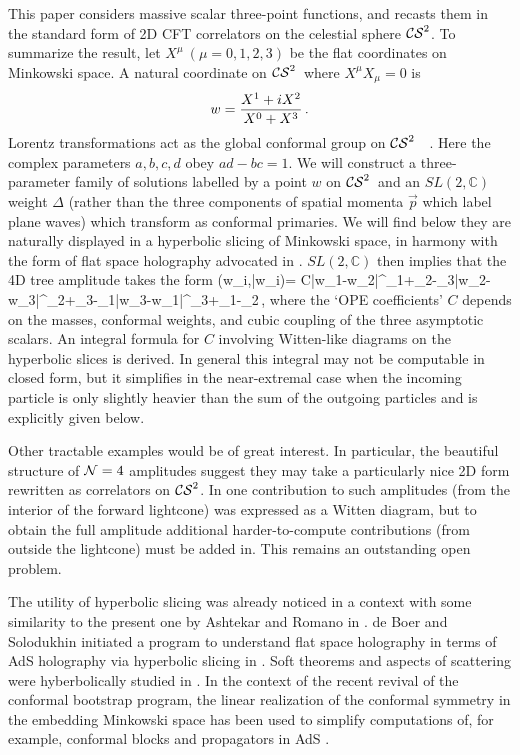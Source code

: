 \documentclass[12pt]{article}
\def\cst{${\cal CS}^2$}
\numberwithin{equation}{section}
\def\be#1\ee{\begin{align}#1\end{align}}
\begin{document}
This paper considers massive scalar three-point functions, and recasts them in the standard form of 2D CFT correlators on the celestial sphere \cst. To summarize the result, let $X^\mu~(\mu=0,1,2,3)$ be the flat coordinates on Minkowski space.   A natural coordinate on \cst\ where $X^\mu X_\mu=0$ is  
\begin{equation}\label{sdf} w={X^1+iX^2 \over X^0+X^3}\,.\end{equation}
Lorentz transformations act as the global conformal group on \cst\ 
\be w \to {aw+b\over cw+d}\,.\ee
Here the complex parameters $a,b,c,d$ obey $ad-bc=1$. We will construct a three-parameter family of solutions labelled by a point $w$ on \cst\ and an $SL(2,\mathbb{C})$  weight $\Delta$  (rather than the three components of spatial momenta $\vec p$ which label plane waves) which transform as conformal primaries. We will find below they are naturally displayed in a hyperbolic slicing of Minkowski space, in harmony with the form of flat space holography advocated in \cite{deBoer:2003vf}. 
$SL(2,\mathbb{C})$ then  implies that the  4D tree amplitude takes the form  
\be  \mathcal{ \tilde A} (w_i,\bar w_i)= {C\over |w_1-w_2|^{\Delta_1+\Delta_2-\Delta_3}|w_2-w_3|^{\Delta_2+\Delta_3-\Delta_1}|w_3-w_1|^{\Delta_3+\Delta_1-\Delta_2}}\,,\ee
where the `OPE coefficients'  $C$ depends on the masses, conformal weights, and cubic coupling of the three asymptotic scalars. An integral formula for $C$ involving Witten-like diagrams on the hyperbolic slices is derived. 
 In general this integral may not be computable in closed form, but it simplifies in the near-extremal case when the incoming particle is only slightly heavier than the sum of the outgoing particles and is explicitly given below. 
 
 Other tractable examples would be of great interest. In particular, the beautiful structure of 
 ${\cal N}=4$ amplitudes suggest they may take a particularly nice 2D form rewritten as correlators on \cst.  In \cite{Cheung:2016iub} one contribution to such amplitudes (from the interior of the forward lightcone) was expressed as a Witten diagram, but to obtain the full amplitude additional harder-to-compute contributions (from outside the lightcone) must be added in. This remains an outstanding open problem. 
 
 The utility of hyperbolic slicing was already noticed in a context with some similarity to the present one by Ashtekar and Romano in \cite{Ashtekar:1991vb}. de Boer and Solodukhin initiated a program to understand flat space holography in terms of AdS holography via hyperbolic slicing in \cite{deBoer:2003vf}. 
Soft theorems and aspects of scattering were hyberbolically studied  in \cite{Campiglia:2015qka,Campiglia:2015kxa,Campiglia:2015lxa,Cheung:2016iub}. 
 In the context of the recent revival of the conformal bootstrap program, the linear realization of the conformal symmetry in the embedding  Minkowski space has been used to simplify computations of, for example,  conformal blocks and  propagators  in AdS \cite{Cornalba:2009ax,Weinberg:2010fx,Costa:2011mg,Costa:2011dw,SimmonsDuffin:2012uy}. 
\end{document}
